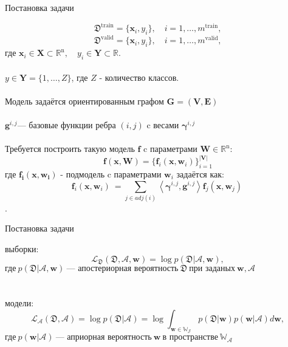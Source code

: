 \documentclass[10pt]{beamer}
\begin{document}
\begin{frame}{Постановка задачи}

\[
\mathfrak{D}^{\text{train}} = \{\mathbf{x}_i, y_i\}, \quad i=1,\dots,m^{\text{train}},
\]
\[
\mathfrak{D}^{\text{valid}} = \{\mathbf{x}_i, y_i\}, \quad i=1,\dots,m^{\text{valid}},
\]
 где $\mathbf{x}_i\in\mathbf{X}\subset\mathbb{R}^{\text{n}},\quad y_i\in\mathbf{Y}\subset\mathbb{R}.$\\
~\\
$y\in\mathbf{Y}= \{1,\dots,Z\}$, где $Z$ - количество классов.\\
~\\
Модель задаётся ориентированным графом $\mathbf{G=(V,E)}$\\
~\\
$\mathbf{g}^{i,j} $--- базовые функции ребра $(i, j) $ c весами $\boldsymbol{\gamma}^{i,j}$\\
~\\
Требуется построить такую модель $\mathbf{f}$ c параметрами $\mathbf{W}\in\mathbb{R}^\text{n}$:
\[
\mathbf{f}(\mathbf{x}, \mathbf{W})= \{ \mathbf{f}_i(\mathbf{x}, \mathbf{w}_i)\}_{i=1}^\mathbf{|V|}
\]
где $\mathbf{f_i(x, w_i)}$ - подмодель c параметрами $\mathbf{w}_i$ задаётся как:
\[
\mathbf{f}_i(\mathbf{x}, \mathbf{w}_i)\ = \sum_{j\in adj(i)} \left\langle {\boldsymbol{\gamma}^{i,j}, \mathbf{g}^{i,j}} \right\rangle \mathbf{f}_j(\mathbf{x}, \mathbf{w}_j)\
\].


\end{frame}

\begin{frame}{Постановка задачи}

{ выборки:}
$$\mathcal{L}_\mathfrak{D}(\mathfrak{D}, \mathcal{A}, \textbf{w}) = \log p(\mathfrak{D}|\mathcal{A}, \textbf{w}),$$
$\text{где}~p(\mathfrak{D}|\mathcal{A},\textbf{w})~\text{--- апостериорная вероятность}~\mathfrak{D}~\text{при заданых}~\textbf{w}, \mathcal{A}$\\
~\\
~\\

{ модели:}
$$\mathcal{L}_{\mathcal{A}}(\mathfrak{D},\mathcal{A}) =\log p(\mathfrak{D}|\mathcal{A}) = \log  \int_{{\textbf{w}\in\mathbb{W_\mathcal{J}}}}
p(\mathfrak{D} | \textbf{w}) p(\textbf{w} | \mathcal{A}) d \textbf{w},$$
$\text{где}~p(\textbf{w}|\mathcal{A})~\text{--- априорная вероятность}~\textbf{w}~\text{в пространстве}~\mathbb{W_\mathcal{A}} $

\end{frame}
\end{document}
